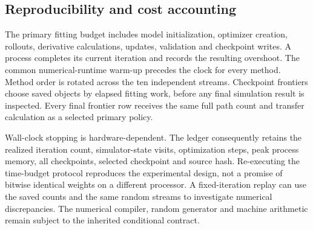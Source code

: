 \subsection{Reproducibility and cost accounting}
The primary fitting budget includes model initialization, optimizer creation, rollouts, derivative calculations, updates, validation and checkpoint writes. A process completes its current iteration and records the resulting overshoot. The common numerical-runtime warm-up precedes the clock for every method. Method order is rotated across the ten independent streams. Checkpoint frontiers choose saved objects by elapsed fitting work, before any final simulation result is inspected. Every final frontier row receives the same full path count and transfer calculation as a selected primary policy.

Wall-clock stopping is hardware-dependent. The ledger consequently retains the realized iteration count, simulator-state visits, optimization steps, peak process memory, all checkpoints, selected checkpoint and source hash. Re-executing the time-budget protocol reproduces the experimental design, not a promise of bitwise identical weights on a different processor. A fixed-iteration replay can use the saved counts and the same random streams to investigate numerical discrepancies. The numerical compiler, random generator and machine arithmetic remain subject to the inherited conditional contract.
